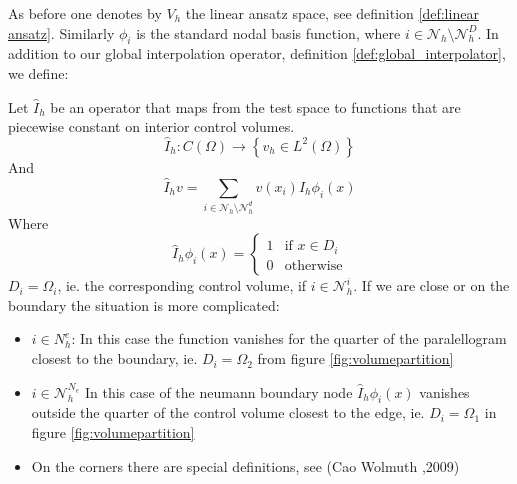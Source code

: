 \documentclass[../Main/main.tex]{subfiles}
\begin{document}
	\par 
	As before one denotes by $V_h$ the linear ansatz space, see definition \ref{def:linear ansatz}. Similarly $\phi_i$ is the standard nodal basis function, where $i \in \mathcal{N}_h \setminus \mathcal{N}_h^D$.
	In addition to our global interpolation operator, definition \ref{def:global_interpolator}, we define:
	\begin{definition} \label{def:piecewise_interpolator}
		Let $\hat{I}_h$ be an operator that maps from the test space to functions that are piecewise constant on interior control volumes.
		\begin{equation*}
			\hat{I}_h:C(\Omega)\rightarrow \left \{ v_h \in L^2(\Omega) \right \}
		\end{equation*}
		And
		\begin{equation*}
			\hat{I}_h v = \sum_{i\in \mathcal{N}_h\setminus\mathcal{N}_h^d}v(x_i)\hat{I}_h\phi_i(x)
		\end{equation*}
		Where
		\begin{equation}
			\hat{I}_h\phi_i(x)=\left\{\begin{matrix}
				1 & \text{if } x\in D_i\\ 
				0 & \text{otherwise}
			\end{matrix}\right.
		\end{equation}
		$D_i = \Omega_i$, ie. the corresponding control volume, if $i \in \mathcal{N}_h^i$. If we are close or on the boundary the situation is more complicated: 
		\begin{itemize}
			\item $i \in N_h^e$: In this case the function vanishes for the quarter of the paralellogram closest to the boundary, ie. $D_i = \Omega_2$ from figure \ref{fig:volumepartition}
			\item $i \in \mathcal{N}_h^{N_e}$ In this case of the neumann boundary node $	\hat{I}_h\phi_i(x)$ vanishes outside the quarter of the control volume closest to the edge, ie. $D_i = \Omega_1$ in figure \ref{fig:volumepartition}
			\item On the corners there are special definitions, see (Cao Wolmuth \cite{https://doi.org/10.1002/num.20525},2009)
		\end{itemize} 
	\end{definition}
	
\end{document}
